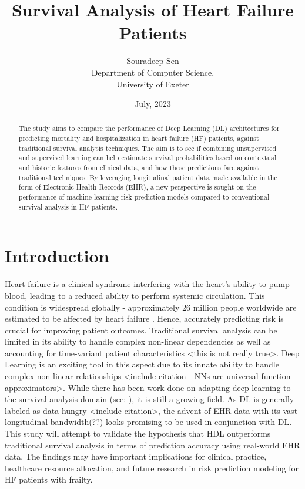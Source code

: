 \documentclass[%
 reprint,
 amsmath,amssymb,
 aps,
]{revtex4-2}
\begin{document}


\title{Survival Analysis of Heart Failure Patients}%
\author{Souradeep Sen \\
	 \small Department of Computer Science, \\ 
	 \small University of Exeter
	}

\date{July, 2023}%

\begin{abstract}
The study aims to compare the performance of Deep Learning (DL) architectures for predicting mortality and hospitalization in heart failure (HF) patients, against traditional survival analysis techniques. The aim is to see if combining unsupervised and supervised learning can help estimate survival probabilities based on contextual and historic features from clinical data, and how these predictions fare against traditional techniques. By leveraging longitudinal patient data made available in the form of Electronic Health Records (EHR), a new perspective is sought on the performance of machine learning risk prediction models compared to conventional survival analysis in HF patients.
\end{abstract}

\maketitle

\section{\label{intro}Introduction}
Heart failure is a clinical syndrome interfering with the heart's ability to pump blood, leading to a reduced ability to perform systemic circulation. This condition is widespread globally - approximately 26 million people worldwide are estimated to be affected by heart failure \cite{Savarese_Lund_2017}. Hence, accurately predicting risk is crucial for improving patient outcomes. Traditional survival analysis can be limited in its ability to handle complex non-linear dependencies as well as accounting for time-variant patient characteristics <this is not really true>. Deep Learning is an exciting tool in this aspect due to its innate ability to handle complex non-linear relationships <include citation - NNs are universal function approximators>. While there has been work done on adapting deep learning to the survival analysis domain (see: ), it is still a growing field. As DL is generally labeled as data-hungry <include citation>, the advent of EHR data with its vast longitudinal bandwidth(??) looks promising to be used in conjunction with DL. This study will attempt to validate the hypothesis that HDL outperforms traditional survival analysis in terms of prediction accuracy using real-world EHR data. The findings may have important implications for clinical practice, healthcare resource allocation, and future research in risk prediction modeling for HF patients with frailty.
\end{document}
